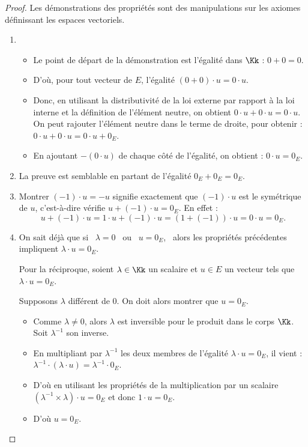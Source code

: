 \documentclass[class=report,crop=false]{standalone}
\begin{document}
\begin{proof}
Les démonstrations des propriétés sont des manipulations sur
les axiomes définissant les espaces vectoriels.

\begin{enumerate}
  \item
  \begin{itemize}
    \item Le point de départ de la démonstration est l'égalité dans $\Kk$ : $0+0=0$.
    \item D'où, pour tout vecteur de $E$, l'égalité $(0+0)\cdot u=0 \cdot u$.
    \item Donc, en utilisant la distributivité de la loi externe par rapport à la loi interne
 et la définition de  l'élément neutre, on obtient $0 \cdot u +0 \cdot u =0 \cdot u$.
 On peut rajouter l'élément neutre dans le terme de droite, pour obtenir :
 $0 \cdot u +0 \cdot u =0 \cdot u+0_{E}$.
    \item En ajoutant $-(0\cdot u)$ de chaque côté de l'égalité, on obtient :
    $0 \cdot u=0_{E}$.
  \end{itemize}

  \item La preuve est semblable en partant de l'égalité $0_{E}+0_{E}=0_{E}$.

  \item Montrer $(-1)\cdot u = -u$ signifie exactement que $(-1)\cdot u$
  est le symétrique de $u$, c'est-à-dire vérifie  $u + (-1)\cdot u = 0_E$.
  En effet :
  $$u+(-1)\cdot u=1\cdot u+(-1) \cdot u=\left ( 1+ (-1)\right ) \cdot u=0 \cdot u= 0_{E}.$$

  \item

  On sait déjà que si \ $\lambda = 0$ \ ou \ $u = 0_E$, \ alors les propriétés précédentes
  impliquent $\lambda \cdot u = 0_E$.

  Pour la réciproque, soient $\lambda \in \Kk$ un scalaire et $u \in E$  un vecteur
  tels que $\lambda \cdot u=0_{E}$.

  Supposons $\lambda$ différent de $0$. On doit alors montrer que $u=0_E$.

  \begin{itemize}
    \item Comme $\lambda\neq0$, alors $\lambda$ est inversible pour le produit dans le corps $\Kk$. Soit
  $\lambda ^{-1}$ son inverse.

    \item En multipliant par $\lambda^{-1}$ les deux membres de l'égalité $\lambda \cdot u = 0_E$, il vient :
  $\lambda^{-1} \cdot (\lambda \cdot u)=\lambda ^{-1} \cdot 0_{E}$.

    \item D'où en utilisant les propriétés de la multiplication par un scalaire
    $(\lambda^{-1} \times \lambda) \cdot u=0_{E}$ et donc $1 \cdot u=0_{E}.$

    \item D'où $u=0_{E}$.
  \end{itemize}
\end{enumerate}
\end{proof}
\end{document}
